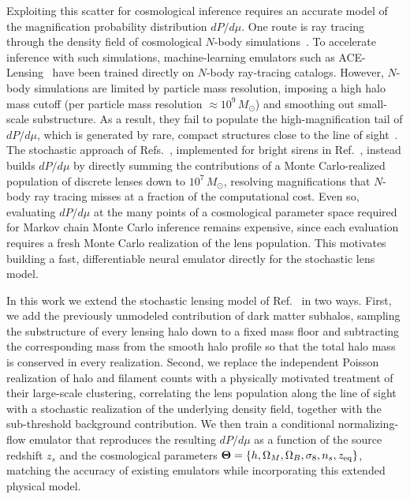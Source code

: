 \documentclass[aps,prd,10pt,nofootinbib,twocolumn,superscriptaddress,floatfix,notitlepage]{revtex4-1}
\newcommand{\Msun}{M_\odot}
\newcommand{\vect}[1]{\boldsymbol{#1}}
\begin{document}
Exploiting this scatter for cosmological inference requires an accurate model of the magnification probability distribution $dP/d\mu$. One route is ray tracing through the density field of cosmological $N$-body simulations~\cite{Holz:1997ic,Holz:2004xx,Takahashi:2011qd,Takahashi:2017hjr}. To accelerate inference with such simulations, machine-learning emulators such as ACE-Lensing~\cite{Turker:2025rdt} have been trained directly on $N$-body ray-tracing catalogs. However, $N$-body simulations are limited by particle mass resolution, imposing a high halo mass cutoff (per particle mass resolution $\approx 10^{9}\,\Msun$) and smoothing out small-scale substructure. As a result, they fail to populate the high-magnification tail of $dP/d\mu$, which is generated by rare, compact structures close to the line of sight~\cite{DES:2025omh}. The stochastic approach of Refs.~\cite{Kainulainen:2009dw,Kainulainen:2010at,Kainulainen:2011zx}, implemented for bright sirens in Ref.~\cite{Vaskonen:2026ubd}, instead builds $dP/d\mu$ by directly summing the contributions of a Monte Carlo-realized population of discrete lenses down to $10^7\,\Msun$, resolving magnifications that $N$-body ray tracing misses at a fraction of the computational cost. Even so, evaluating $dP/d\mu$ at the many points of a cosmological parameter space required for Markov chain Monte Carlo inference remains expensive, since each evaluation requires a fresh Monte Carlo realization of the lens population. This motivates building a fast, differentiable neural emulator directly for the stochastic lens model.

In this work we extend the stochastic lensing model of Ref.~\cite{Vaskonen:2026ubd} in two ways. First, we add the previously unmodeled contribution of dark matter subhalos, sampling the substructure of every lensing halo down to a fixed mass floor and subtracting the corresponding mass from the smooth halo profile so that the total halo mass is conserved in every realization. Second, we replace the independent Poisson realization of halo and filament counts with a physically motivated treatment of their large-scale clustering, correlating the lens population along the line of sight with a stochastic realization of the underlying density field, together with the sub-threshold background contribution. We then train a conditional normalizing-flow emulator that reproduces the resulting $dP/d\mu$ as a function of the source redshift $z_s$ and the cosmological parameters $\vect\Theta = \{h,\Omega_M,\Omega_B,\sigma_8,n_s,z_{\rm eq}\}$, matching the accuracy of existing emulators while incorporating this extended physical model.
\end{document}
